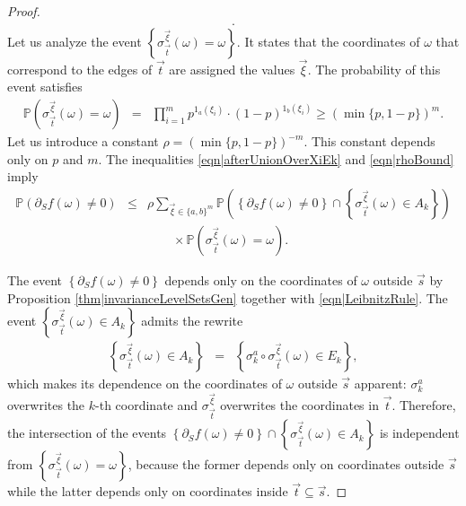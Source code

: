 \documentclass[reqno]{amsart}
\begin{document}
\begin{proof}
\begin{eqnarray}
.
 \label{eqn|afterUnionOverXiEk}
\end{eqnarray}
Let us analyze the event $\left\{\sigma_{\overrightarrow t}^{\overrightarrow \xi}(\omega)=\omega\right\}$. It states that the coordinates of $\omega$ that correspond to the edges of $\overrightarrow t$ are assigned the values $\overrightarrow \xi$. The probability of this event satisfies 
\begin{eqnarray}\mathbb P
\left(\sigma_{\overrightarrow t}^{\overrightarrow \xi}(\omega)=\omega\right)&=& \prod_{i=1}^m p^{1_a(\xi_i)}\cdot (1-p)^{1_b(\xi_i)}\geq \left( \min\{p,1-p\}\right)^m. \label{eqn|rhoBound}
\end{eqnarray}
Let us introduce a constant $\rho=\left( \min\{p,1-p\}\right)^{-m}$. This constant depends only on $p$ and $m$.
The inequalities \eqref{eqn|afterUnionOverXiEk} and \eqref{eqn|rhoBound} imply
\begin{eqnarray}
\mathbb P\left(\partial_Sf(\omega)\neq 0\right)&\leq& \rho\sum_{\overrightarrow\xi\in\{a,b\}^m}
\mathbb P\left(\left\{\partial_Sf(\omega)\neq 0\right\}\cap \left\{
\sigma^{\overrightarrow \xi}_{\overrightarrow t}(\omega)\in A_k\right\}\right) \nonumber \\ &&\quad\quad\times  \mathbb P\left(\sigma_{\overrightarrow t}^{\overrightarrow \xi}(\omega)=\omega\right)
.
 \label{eqn|afterUnionOverXiEk2}
\end{eqnarray}
 
The event $\left\{\partial_Sf(\omega)\neq 0\right\}$ depends only on the coordinates of $\omega$ outside $\overrightarrow s$ by Proposition \ref{thm|invarianceLevelSetsGen} together with \eqref{eqn|LeibnitzRule}. The event $\left\{\sigma^{\overrightarrow \xi}_{\overrightarrow t}(\omega)\in A_k\right\}$ admits the rewrite
\begin{eqnarray*}
\left\{\sigma^{\overrightarrow \xi}_{\overrightarrow t}(\omega)\in A_k\right\} 
&=&
\left\{\sigma_k^a\circ\sigma^{\overrightarrow \xi}_{\overrightarrow t}(\omega)\in E_k\right\},
\end{eqnarray*}
which makes its dependence on the coordinates of $\omega$ outside $\overrightarrow s$ apparent: $\sigma_k^a$ overwrites the $k$-th coordinate and $\sigma^{\overrightarrow \xi}_{\overrightarrow t}$ overwrites the coordinates in $\overrightarrow t$. Therefore, the intersection of the events $\left\{\partial_Sf(\omega) \neq 0\right\}\cap \left\{
\sigma^{\overrightarrow \xi}_{\overrightarrow t}(\omega)\in A_k\right\}$ is independent from $\left\{
\sigma_{\overrightarrow t}^{\overrightarrow\xi}(\omega)=\omega
\right\}$, because the former depends only on coordinates outside $\overrightarrow s$ while the latter depends only on coordinates inside $\overrightarrow t\subseteq \overrightarrow s$.


\end{proof}
\end{document}
